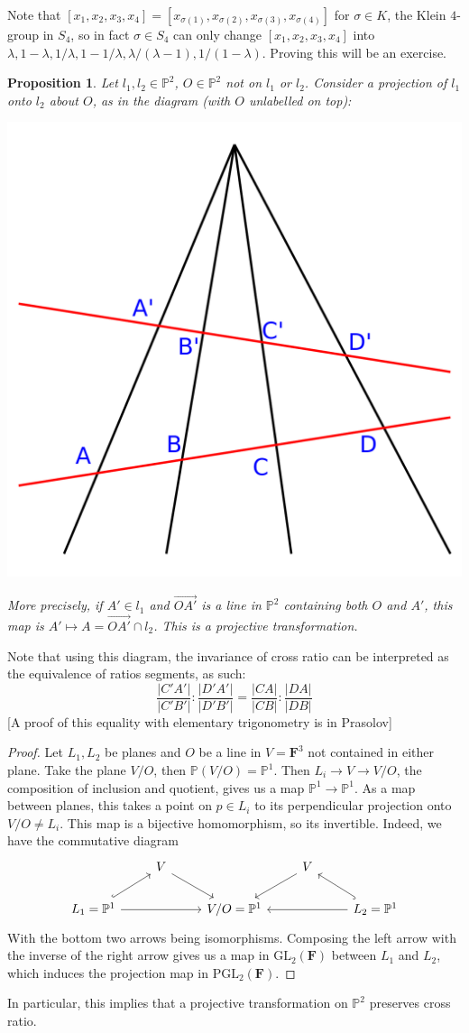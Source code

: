 \documentclass[12pt]{article}
\newcommand{\F}{\mathbf{F}}
\renewcommand{\P}{\mathbb{P}}
\newcommand{\GL}{\mathrm{GL}}
\renewcommand{\vec}{\overrightarrow}
\newcommand{\PGL}{\mathrm{PGL}}
\newtheorem{proposition}{Proposition}[section]
\begin{document}
    Note that $[x_1, x_2, x_3, x_4] = [x_{\sigma(1)}, x_{\sigma(2)}, x_{\sigma(3)}, x_{\sigma(4)}]$ for $\sigma \in K$, the Klein $4$-group in $S_4$, so in fact $\sigma \in S_4$ can only change $[x_1, x_2, x_3, x_4]$ into $\lambda, 1-\lambda, 1/\lambda, 1-1/\lambda, \lambda/(\lambda-1), 1/(1-\lambda)$. Proving this will be an exercise. \par 
    \begin{proposition}
        Let $l_1, l_2 \in \P^2$, $O \in \P^2$ not on $l_1$ or $l_2$. Consider a projection of $l_1$ onto $l_2$ about $O$, as in the diagram (with $O$ unlabelled on top): 
        \begin{center}
            \includegraphics[width = 0.4\linewidth]{crossratio.png}
        \end{center}
        More precisely, if $A' \in l_1$ and $\vec{OA'}$ is a line in $\P^2$ containing both $O$ and $A'$, this map is $A' \mapsto A = \vec{OA'} \cap l_2$. This is a projective transformation. 
    \end{proposition} 
    Note that using this diagram, the invariance of cross ratio can be interpreted as the equivalence of ratios segments, as such: 
    $$\frac{|C'A'|}{|C'B'|}: \frac{|D'A'|}{|D'B'|} = \frac{|CA|}{|CB|}: \frac{|DA|}{|DB|}$$
    [A proof of this equality with elementary trigonometry is in Prasolov]
    \begin{proof}
        Let $L_1, L_2$ be planes and $O$ be a line in $V = \F^3$ not contained in either plane. Take the plane $V/O$, then $\P(V/O) = \P^1$. Then $L_i \to V \to V/O$, the composition of inclusion and quotient, gives us a map $\P^1 \to \P^1$. As a map between planes, this takes a point on $p \in L_i$ to its perpendicular projection onto $V/O \neq L_i$. This map is a bijective homomorphism, so its invertible. Indeed, we have the commutative diagram
        \[\begin{tikzcd}
            & V && V \\
            {L_1=\mathbb{P}^1} && {V/O=\mathbb{P}^1} && {L_2 = \mathbb{P}^1}
            \arrow[hook, from=2-1, to=1-2]
            \arrow[hook, from=2-5, to=1-4]
            \arrow[from=1-2, to=2-3]
            \arrow[from=1-4, to=2-3]
            \arrow[from=2-1, to=2-3]
            \arrow[from=2-5, to=2-3]
        \end{tikzcd}\]
        With the bottom two arrows being isomorphisms. Composing the left arrow with the inverse of the right arrow gives us a map in $\GL_2(\F)$ between $L_1$ and $L_2$, which induces the projection map in $\PGL_2(\F)$.  
    \end{proof}
    In particular, this implies that a projective transformation on $\P^2$ preserves cross ratio. 
\end{document}
